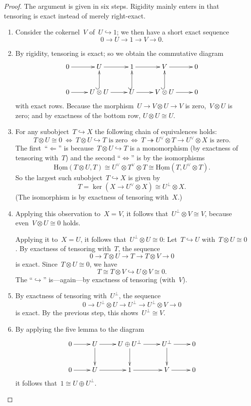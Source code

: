 \documentclass[a4paper,english,12pt]{scrartcl}
\theoremstyle{definition}
\theoremstyle{plain}
\theoremstyle{remark}
\renewcommand{\_}{\mathpunct{.}\,}
\newcommand{\?}{\,{:}\,}
\newcommand{\Hom}{\underline{\mathrm{Hom}}}
\begin{document}
\begin{proof}The argument is given in six steps. Rigidity mainly enters in that
tensoring is exact instead of merely right-exact.\begin{enumerate}
\item Consider the cokernel~$V$ of~$U \hookrightarrow 1$; we then have a short
exact sequence
\[ 0 \longrightarrow U \longrightarrow 1 \longrightarrow V \longrightarrow 0.
\]
\item By rigidity, tensoring is exact; so we obtain the commutative diagram
\[ \xymatrix{
  0 \ar[r] & U \ar[r] & 1 \ar[r] & V \ar[r] & 0 \\
  0 \ar[r] & U \otimes U \ar[r] \ar@{^{(}->}[u] & U \ar[r] \ar@{^{(}->}[u] & V \otimes U \ar[r]
  \ar@{^{(}->}[u] & 0
} \]
with exact rows. Because the morphism~$U \to V \otimes U \to V$ is zero,~$V
\otimes U$ is zero; and by exactness of the bottom row, $U \otimes U \cong U$.
\item For any subobject~$T \hookrightarrow X$ the following chain of
equivalences holds:
\[ T \otimes U \cong 0
  \ \Longleftrightarrow\ 
  \text{$T \otimes U \hookrightarrow T$ is zero}
  \ \Longleftrightarrow\ 
  \text{$T \twoheadrightarrow U^\vee \otimes T \to U^\vee \otimes X$ is zero}.
  \]
The first~``$\Leftarrow$'' is because~$T \otimes U \hookrightarrow T$ is a
monomorphism (by exactness of tensoring with~$T$) and the second
``$\Leftrightarrow$'' is by the isomorphisms
\[ \Hom(T \otimes U, T) \cong U^\vee \otimes T^\vee \otimes T \cong
  \Hom(T, U^\vee \otimes T). \]
So the largest such subobject~$T \hookrightarrow X$ is given by
\[ T = \ker(X \to U^\vee \otimes X) \cong U^\perp \otimes X. \]
(The isomorphism is by exactness of tensoring with~$X$.)
\item Applying this observation to~$X = V$, it follows that~$U^\perp \otimes V
\cong V$, because even~$V \otimes U \cong 0$ holds.

Applying it to~$X = U$, it follows that~$U^\perp \otimes U \cong 0$: Let~$T
\hookrightarrow U$ with~$T \otimes U \cong 0$. By exactness of tensoring
with~$T$, the sequence
\[ 0 \longrightarrow T \otimes U \longrightarrow T \longrightarrow T \otimes V
\longrightarrow 0 \]
is exact. Since~$T \otimes U \cong 0$, we have
\[ T \cong T \otimes V \hookrightarrow U \otimes V \cong 0. \]
The ``$\hookrightarrow$'' is---again---by exactness of tensoring (with~$V$).

\item By exactness of tensoring with~$U^\perp$, the sequence
\[ 0 \longrightarrow U^\perp \otimes U \longrightarrow U^\perp \longrightarrow
U^\perp \otimes V \longrightarrow 0 \]
is exact. By the previous step, this shows~$U^\perp \cong V$.

\item By applying the five lemma to the diagram
\[ \xymatrix{
  0 \ar[r] & U \ar[r] \ar[d] & U \oplus U^\perp \ar[r] \ar[d] & U^\perp \ar[r] \ar[d] & 0 \\
  0 \ar[r] & U \ar[r] & 1 \ar[r] & V \ar[r] & 0
} \]
it follows that~$1 \cong U \oplus U^\perp$. \qedhere
\end{enumerate}
\end{proof}
\end{document}
